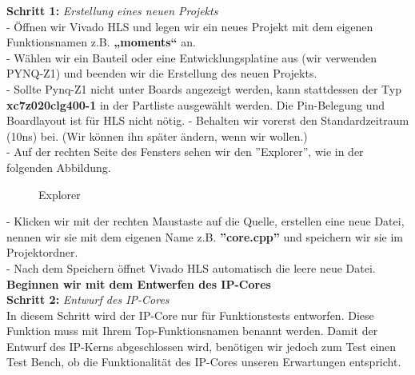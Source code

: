 \documentclass[a4paper]{report}
\begin{document}
\textbf{Schritt 1:} \textit{Erstellung eines neuen Projekts}\\
- Öffnen wir Vivado HLS und legen wir ein neues Projekt mit dem eigenen Funktionsnamen z.B. \textbf{„moments“} an.\\
- Wählen wir ein Bauteil oder eine Entwicklungsplatine aus (wir verwenden PYNQ-Z1) und
 beenden wir die Erstellung des neuen Projekts.\\
 - Sollte Pynq-Z1 nicht unter Boards angezeigt werden, kann stattdessen der Typ \textbf{xc7z020clg400-1} in der Partliste ausgewählt werden. Die Pin-Belegung und Boardlayout ist für HLS nicht nötig. 
- Behalten wir vorerst den Standardzeitraum (10ns) bei. (Wir können ihn später ändern, wenn wir wollen.)\\
- Auf der rechten Seite des Fensters sehen wir den ''Explorer'', wie in der folgenden Abbildung.\\
\begin{figure}[H]
\centering
{}
\caption{Explorer}
\label{fig:Explorer}
\end{figure}

- Klicken wir mit der rechten Maustaste auf die Quelle, erstellen eine neue Datei, nennen wir sie mit dem eigenen Name z.B. \textbf{''core.cpp''} und speichern wir sie im Projektordner.\\
 
- Nach dem Speichern öffnet Vivado HLS automatisch die leere neue Datei. \\

 \textbf{Beginnen wir mit dem Entwerfen des IP-Cores}\\

\textbf{Schritt 2:} \textit{Entwurf des IP-Cores}\\

In diesem Schritt wird der IP-Core nur für Funktionstests entworfen. Diese Funktion muss mit Ihrem Top-Funktionsnamen benannt werden. Damit der Entwurf des IP-Kerns abgeschlossen wird, benötigen wir jedoch zum Test einen Test Bench, ob die Funktionalität des IP-Cores unseren Erwartungen entspricht.\\
\end{document}
